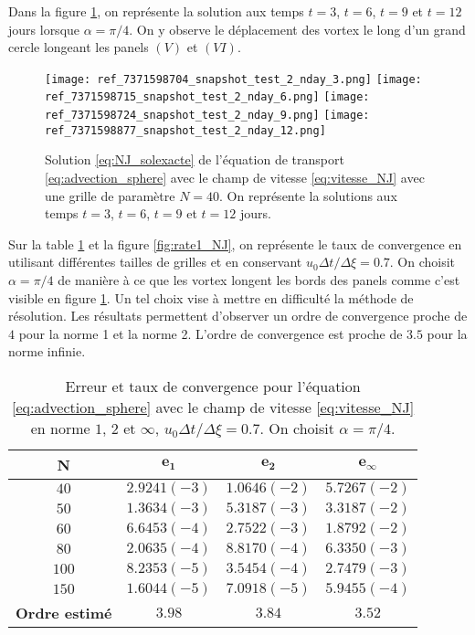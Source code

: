 Dans la figure \ref{fig:NJ_difftps}, on représente la solution aux temps $t=3$, $t=6$, $t=9$ et $t=12$ jours lorsque $\alpha = \pi/4$. On y observe le déplacement des vortex le long d'un grand cercle longeant les panels $(V)$ et $(VI)$.

\begin{figure}[htbp]
\begin{center}
\texttt{[image: ref\_7371598704\_snapshot\_test\_2\_nday\_3.png]}
\texttt{[image: ref\_7371598715\_snapshot\_test\_2\_nday\_6.png]}
\texttt{[image: ref\_7371598724\_snapshot\_test\_2\_nday\_9.png]}
\texttt{[image: ref\_7371598877\_snapshot\_test\_2\_nday\_12.png]}
\end{center}
\caption{Solution \eqref{eq:NJ_solexacte} de l'équation de transport \eqref{eq:advection_sphere} avec le champ de vitesse \eqref{eq:vitesse_NJ} avec une grille de paramètre $N=40$. On représente la solutions aux temps $t=3$, $t=6$, $t=9$ et $t=12$ jours.}
\label{fig:NJ_difftps} 
\end{figure}

Sur la table \ref{tab:rate1_NJ} et la figure \ref{fig:rate1_NJ}, on représente le taux de convergence en utilisant différentes tailles de grilles et en conservant $u_0 \Delta t / \Delta \xi = 0.7$. On choisit $\alpha = \pi/4$ de manière à ce que les vortex longent les bords des panels comme c'est visible en figure \ref{fig:NJ_difftps}. Un tel choix vise à mettre en difficulté la méthode de résolution. Les résultats permettent d'observer un ordre de convergence proche de $4$ pour la norme 1 et la norme 2. L'ordre de convergence est proche de $3.5$ pour la norme infinie. 

\begin{table}[htbp]
\begin{center}
\begin{tabular}{|c||c|c|c|}
\hline
\textbf{N}  & $\mathbf{e_1}$ & $\mathbf{e_2}$ & $\mathbf{e_{\infty}}$\\
\hline
\hline
$40$  & $2.9241 (-3)$ & $1.0646 (-2)$ & $5.7267 (-2)$ \\
$50$  & $1.3634 (-3)$ & $5.3187 (-3)$ & $3.3187 (-2)$ \\
$60$  & $6.6453 (-4)$ & $2.7522 (-3)$ & $1.8792 (-2)$ \\
$80$  & $2.0635 (-4)$ & $8.8170 (-4)$ & $6.3350 (-3)$ \\
$100$ & $8.2353 (-5)$ & $3.5454 (-4)$ & $2.7479 (-3)$ \\
$150$ & $1.6044 (-5)$ & $7.0918 (-5)$ & $5.9455 (-4)$ \\
\hline 
\hline
\textbf{Ordre estimé}& $3.98$ & $3.84$ & $3.52$\\
\hline
\end{tabular}
\end{center}
\caption{Erreur et taux de convergence pour l'équation \eqref{eq:advection_sphere} avec le champ de vitesse \eqref{eq:vitesse_NJ} en norme $1$, $2$ et $\infty$, $u_0 \Delta t / \Delta \xi = 0.7$. On choisit $\alpha = \pi/4$.}
\label{tab:rate1_NJ}
\end{table} 

